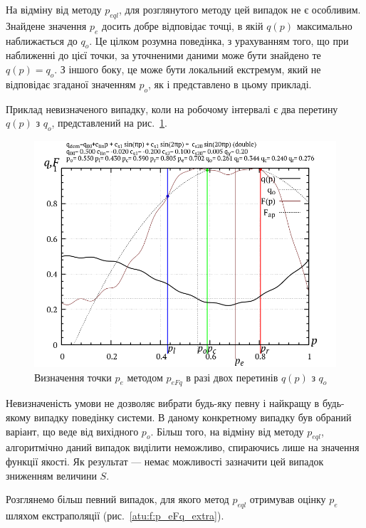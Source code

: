 На відміну від методу
$ p_{eql} $, для розглянутого методу цей випадок не є
особливим. Знайдене значення
$ p_e $ досить добре відповідає точці, в якій
$q(p)$ максимально наближається до
$ q_o $. Це цілком розумна поведінка, з урахуванням того, що при
наближенні до цієї точки, за уточненими даними може бути
знайдено те
$ q (p) = q_o $. З іншого боку, це може бути локальний екстремум, який
не відповідає згаданої значенням
$ p_o $, як і представлено в цьому прикладі.

Приклад невизначеного випадку, коли на робочому інтервалі є
два перетину
$ q (p) $ з
$ q_o $, представлений на рис.~\ref{atu:f:p_eFq_double}.

\begin{figure}[htb!]
  \begin{center}
    \includegraphics[width=60\TW]{p/p_eFq/q_p_eFq_double.png}
  \end{center}
  \caption{Визначення точки $ p_e $ методом $ p_{eFq} $ в разі двох перетинів $ q (p) $ з $ q_o $}
  \label{atu:f:p_eFq_double}
\end{figure}

Невизначеність умови не дозволяє вибрати будь-яку певну і
найкращу в будь-якому випадку поведінку системи. В даному конкретному
випадку був обраний варіант, що веде від вихідного
$ p_o $. Більш того, на відміну від методу
$ p_{eql} $, алгоритмічно даний випадок виділити неможливо,
спираючись лише на значення функції якості. Як результат ---
немає можливості зазначити цей випадок зниженням величини
$S$.

Розглянемо більш певний випадок, для якого метод
$p_{eql}$ отримував оцінку
$ p_e $ шляхом екстраполяції (рис.~\ref{atu:f:p_eFq_extra}).

